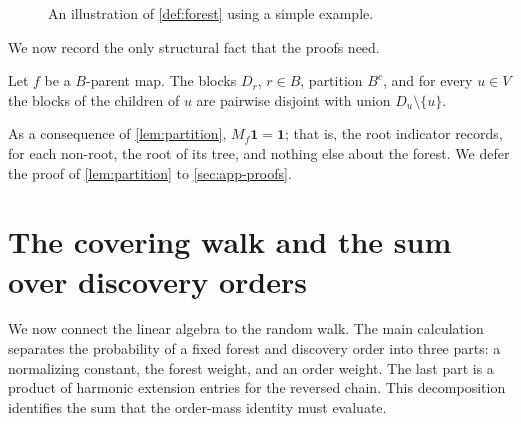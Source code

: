 \documentclass[onefignum,onetabnum,nohypdvips]{siamart250211}
\numberwithin{theorem}{section}
\numberwithin{equation}{section}
\newcommand{\one}{\mathbf{1}}
\begin{document}
\begin{figure}[H]
{}
\caption{An illustration of \cref{def:forest} using a simple example.}
\label{fig:example}
\end{figure}



We now record the only structural
fact that the proofs need.

\begin{lemma}[Blocks]\label{lem:partition}
Let $f$ be a $B$-parent map. The blocks $D_r$, $r\in B$, partition
$B^c$, and for every $u\in V$ the blocks of the children of $u$ are
pairwise disjoint with union $D_u\setminus\{u\}$.
\end{lemma}

As a consequence of \cref{lem:partition}, $M_f\one=\one$; that is,
the root indicator records, for each non-root, the root of its tree,
and nothing else about the forest. We defer the proof of
\cref{lem:partition} to \cref{sec:app-proofs}.



\section{The covering walk and the sum over discovery orders}\label{sec:walk}

We now connect the linear algebra to the random walk. The main
calculation separates the probability of a fixed forest and discovery
order into three parts: a normalizing constant, the forest weight,
and an order weight. The last part is a product of harmonic extension
entries for the reversed chain. This decomposition identifies the sum
that the order-mass identity must evaluate.
\end{document}

